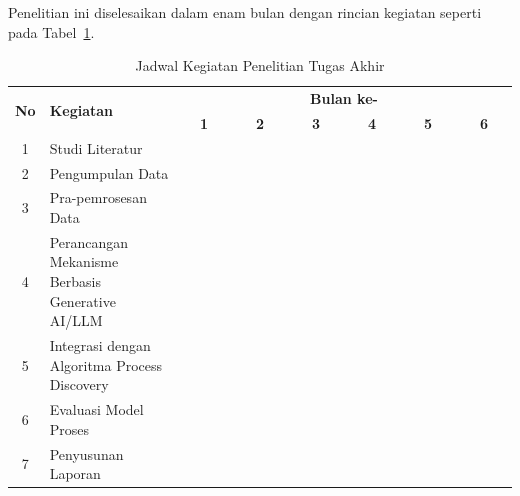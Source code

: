 Penelitian ini diselesaikan dalam enam bulan dengan rincian kegiatan seperti pada Tabel~\ref{tab:jadwalKegiatan}.

\begin{table}[H]
  \centering
  \caption{Jadwal Kegiatan Penelitian Tugas Akhir}
  \label{tab:jadwalKegiatan}
  \footnotesize
  \renewcommand{\arraystretch}{0.95}
  \setlength{\extrarowheight}{0pt}
  {\setlength{\tabcolsep}{2pt}
  \newcommand{\x}{\cellcolor{blue!30}}
  \begin{tabularx}{\textwidth}{|c|X|*{6}{p{0.22cm}p{0.22cm}p{0.22cm}p{0.22cm}|}}
  \hline
  \multirow{2}{*}{\textbf{No}} &
  \multirow{2}{*}{\textbf{Kegiatan}} &
  \multicolumn{24}{c|}{\textbf{Bulan ke-}} \\
  \cline{3-26}
   & &
  \multicolumn{4}{c|}{\textbf{1}} &
  \multicolumn{4}{c|}{\textbf{2}} &
  \multicolumn{4}{c|}{\textbf{3}} &
  \multicolumn{4}{c|}{\textbf{4}} &
  \multicolumn{4}{c|}{\textbf{5}} &
  \multicolumn{4}{c|}{\textbf{6}} \\
  \hline
  1 & Studi Literatur            & \x & \x & \x &    &    &    &    &    &    &    &    &    &    &    &    &    &    &    &    &    &    &    &    &    \\ \hline
  2 & Pengumpulan Data           & \x & \x & \x & \x & \x & \x &    &    &    &    &    &    &    &    &    &    &    &    &    &    &    &    &    &    \\ \hline
  3 & Pra-pemrosesan Data        &    &    &    &    & \x & \x & \x & \x & \x & \x &    &    &    &    &    &    &    &    &    &    &    &    &    &    \\ \hline
  4 & Perancangan Mekanisme Berbasis Generative AI/LLM &    &    &    &    &    &    &    &    & \x & \x & \x & \x & \x & \x &    &    &    &    &    &    &    &    &    &    \\ \hline
  5 & Integrasi dengan Algoritma Process Discovery     &    &    &    &    &    &    &    &    &    &    &    &    & \x & \x & \x & \x & \x & \x &    &    &    &    &    &    \\ \hline
  6 & Evaluasi Model Proses      &    &    &    &    &    &    &    &    &    &    &    &    &    &    &    &    & \x & \x & \x & \x & \x & \x & \x &    \\ \hline
  7 & Penyusunan Laporan         &    &    &    &    &    &    &    &    &    &    &    &    &    &    &    &    &    &    &    &    &    & \x & \x & \x \\ \hline
  \end{tabularx}
  }
\end{table}
